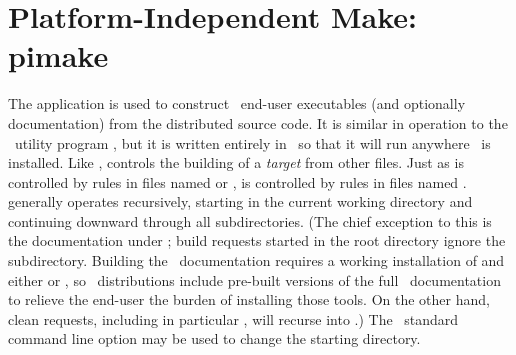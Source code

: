 
\section{Platform-Independent Make:
            pimake\label{sec:pimake}}%

The application  is used to
construct \OOMMF\ end-user executables (and optionally documentation)
from the distributed source code. It is similar in operation to the
\Unix\ utility program , but it is
written entirely in \Tcl\ so that it will run anywhere \Tcl\ is
installed.  Like ,  controls the building of a
{\em target} from other files.  Just as  is controlled by
rules in files named  or ,  is
controlled by rules in files named . 
generally operates recursively, starting in the current working
directory and continuing downward through all subdirectories. (The chief
exception to this is the documentation under ;
 build requests started in the root directory 
ignore the  subdirectory. Building the
\OOMMF\ documentation requires a working installation of
 and either
 or
, so
\OOMMF\ distributions include pre-built versions of the full
\OOMMF\ documentation to relieve the end-user the burden of installing
those tools. On the other hand, clean requests, including in particular
, will recurse into .) The
\OOMMF\ standard command line option  may be used to change the
starting directory.

